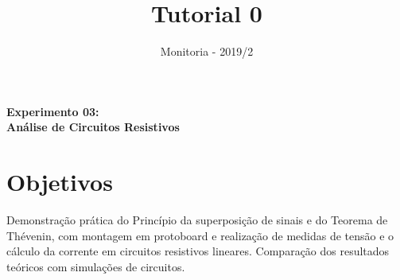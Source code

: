 \documentclass[10pt]{article}
\author{Monitoria - 2019/2}
\title{Tutorial 0}
\numberwithin{table}{subsection}
\numberwithin{figure}{section}
\begin{document}
\begin{center}
\vspace*{.03cm}
\Large\bfseries{Experimento 03:}\\ %
\Large{Análise de Circuitos Resistivos}
\end{center}
\justify

\section{Objetivos}

Demonstração prática do Princípio da superposição de sinais e do Teorema de Thévenin, com montagem em protoboard e realização de medidas de tensão e o cálculo da corrente em circuitos resistivos lineares. Comparação dos resultados teóricos com simulações de circuitos.


\end{document}
